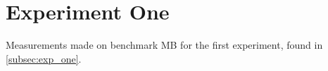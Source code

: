 \section{Experiment One}\label{app:exp_one}

Measurements made on benchmark MB for the first experiment, found in \cref{subsec:exp_one}.

% 
% 
% 

% 


% 

